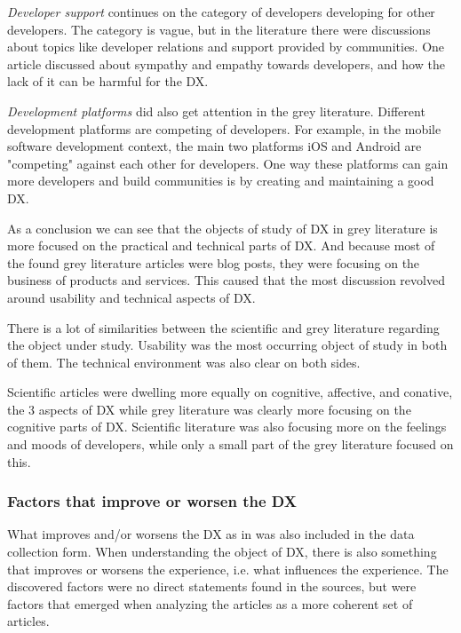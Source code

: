 \documentclass[english, 12pt, a4paper, sci, utf8, a-1b, online]{aaltothesis}
\newcounter{subsubsubsection}[subsubsection]
\begin{document}
\textit{Developer support} continues on the category of developers developing for other developers. The category is vague, but in the literature there were discussions about topics like developer relations and support provided by communities. One article discussed about sympathy and empathy towards developers, and how the lack of it can be harmful for the DX.

\textit{Development platforms} did also get attention in the grey literature. Different development platforms are competing of developers. For example, in the mobile software development context, the main two platforms iOS and Android are "competing" against each other for developers. One way these platforms can gain more developers and build communities is by creating and maintaining a good DX.

As a conclusion we can see that the objects of study of DX in grey literature is more focused on the practical and technical parts of DX. And because most of the found grey literature articles were blog posts, they were focusing on the business of products and services. This caused that the most discussion revolved around usability and technical aspects of DX.


There is a lot of similarities between the scientific and grey literature regarding the object under study. Usability was the most occurring object of study in both of them. The technical environment was also clear on both sides.

Scientific articles were dwelling more equally on cognitive, affective, and conative, the 3 aspects of DX while grey literature was clearly more focusing on the cognitive parts of DX. Scientific literature was also focusing more on the feelings and moods of developers, while only a small part of the grey literature focused on this.

\subsubsection{Factors that improve or worsen the DX}

What improves and/or worsens the DX as in \textcite{fagerholm-doctoral-thesis} was also included in the data collection form. When understanding the object of DX, there is also something that improves or worsens the experience, i.e. what influences the experience. The discovered factors were no direct statements found in the sources, but were factors that emerged when analyzing the articles as a more coherent set of articles.
\end{document}
